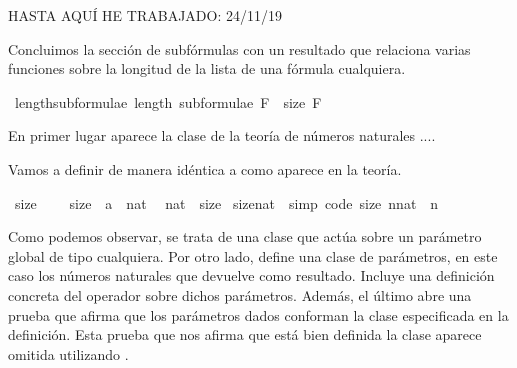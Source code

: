 \begin{isabellebody}
%
\begin{isamarkuptext}%
%
\end{isamarkuptext}\isamarkuptrue%
%
\begin{isamarkuptext}%
HASTA AQUÍ HE TRABAJADO: 24/11/19%
\end{isamarkuptext}\isamarkuptrue%
%
\begin{isamarkuptext}%
Concluimos la sección de subfórmulas con un resultado que 
  relaciona varias funciones sobre la longitud de la lista 
   de una fórmula  cualquiera.%
\end{isamarkuptext}\isamarkuptrue%
\isamarkupfalse%
\ length{\isacharunderscore}subformulae{\isacharcolon}\ {\isachardoublequoteopen}length\ {\isacharparenleft}subformulae\ F{\isacharparenright}\ {\isacharequal}\ size\ F{\isachardoublequoteclose}\ \isanewline
%
\isadelimproof
\ \ %
\endisadelimproof
%
\isatagproof
{}\isamarkupfalse%
%
\endisatagproof
{\isafoldproof}%
%
\isadelimproof
%
\endisadelimproof
%
\begin{isamarkuptext}%
En primer lugar aparece la clase  de la teoría de 
  números naturales ....

  Vamos a definir  de manera idéntica a como aparece 
   en la teoría.%
\end{isamarkuptext}\isamarkuptrue%
\isamarkupfalse%
\ size{}\ {\isacharequal}\isanewline
\ \ \ size{}\ {\isacharcolon}{\isacharcolon}\ {\isachardoublequoteopen}{\isacharprime}a\ {\isasymRightarrow}\ nat{\isachardoublequoteclose}\ \isanewline
\isanewline
{}\isamarkupfalse%
\ nat\ {\isacharcolon}{\isacharcolon}\ size{}\isanewline
{}\isanewline
\isanewline
{}\isamarkupfalse%
\ size{}{\isacharunderscore}nat\ \ {\isacharbrackleft}simp{\isacharcomma}\ code{\isacharbrackright}{\isacharcolon}\ {\isachardoublequoteopen}size{}\ {\isacharparenleft}n{\isacharcolon}{\isacharcolon}nat{\isacharparenright}\ {\isacharequal}\ n{\isachardoublequoteclose}\isanewline
\isanewline
{}\isamarkupfalse%
%
\isadelimproof
\ %
\endisadelimproof
%
\isatagproof
\isacommand{{\isachardot}{\isachardot}}\isamarkupfalse%
%
\endisatagproof
{\isafoldproof}%
%
\isadelimproof
%
\endisadelimproof
\isanewline
\isanewline
{}\isamarkupfalse%
%
\begin{isamarkuptext}%
Como podemos observar, se trata de una clase que actúa sobre un 
  parámetro global de tipo  cualquiera. Por otro lado, 
   define una clase de parámetros, en este caso los 
  números naturales  que devuelve como resultado. Incluye una 
  definición concreta del operador  sobre dichos parámetros. 
  Además, el último  abre una prueba que afirma que los 
  parámetros dados conforman la clase especificada en la definición. 
  Esta prueba que nos afirma que está bien definida la clase aparece
  omitida utilizando \isa{{\isachardot}{\isachardot}} .


\end{isamarkuptext}
\end{isabellebody}
